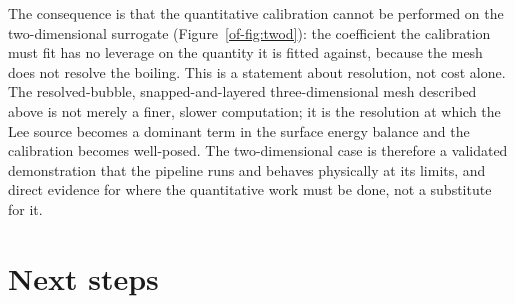 \documentclass[11pt]{article}
\begin{document}
The consequence is that the quantitative calibration cannot be performed on the two-dimensional
surrogate (Figure~\ref{of-fig:twod}): the coefficient the calibration must fit has no leverage on the quantity it is fitted
against, because the mesh does not resolve the boiling. This is a statement about resolution, not cost
alone. The resolved-bubble, snapped-and-layered three-dimensional mesh described above is not
merely a finer, slower computation; it is the resolution at which the Lee source becomes a
dominant term in the surface energy balance and the calibration becomes well-posed. The two-dimensional case is therefore a validated demonstration that the pipeline
runs and behaves physically at its limits, and direct evidence for where the quantitative work
must be done, not a substitute for it.

\section{Next steps}
\label{of-sec:next}
\end{document}
